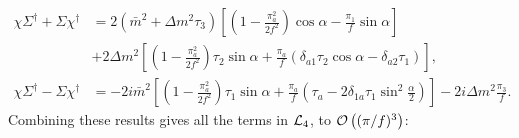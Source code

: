 \begin{align*}
    \chi \Sigma^\dagger + \Sigma \chi^\dagger
    & = 2(\bar m^2 + \Delta m^2 \tau_3)
        \left[
            \left(
                1 
                - \frac{\pi_a^2}{2f^2}
            \right)
            \cos{\alpha}
            - \frac{\pi_1}{f}    
            \sin{\alpha}
        \right]
    \\
    &
    + 2\Delta m^2
    \left[
        \left(
            1 
            - \frac{\pi_a^2}{2f^2}
        \right)
        \tau_2 \sin{\alpha}
        +  \frac{\pi_a}{f}
        \left(
            \delta_{a1} \tau_2 \cos{\alpha} - \delta_{a2} \tau_1
        \right)
    \right], \\
    \chi \Sigma^\dagger  - \Sigma \chi^\dagger
    & = -2i \bar m^2
        \left[
            \left(
                1 - \frac{\pi_a^2}{2f^2}
            \right)
            \tau_1 \sin{\alpha}
            +  \frac{\pi_a}{f}    \left(
                \tau_a 
                - 2 \delta_{1a} \tau_1 \sin^2{\frac{\alpha}{2}}
            \right)        
        \right]
        -2i \Delta m^2 \frac{\pi_3}{f}.
\end{align*}
Combining these results gives all the terms in $\Ell_4$, to $\Oh[3]{(\pi/f)}$:
\begingroup
\allowdisplaybreaks %
